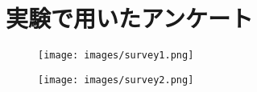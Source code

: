 \appendix
\chapter{実験で用いたアンケート}

\begin{figure}[H]
    \centering
    \texttt{[image: images/survey1.png]}
\end{figure}

\begin{figure}[H]
    \centering
    \texttt{[image: images/survey2.png]}
\end{figure}